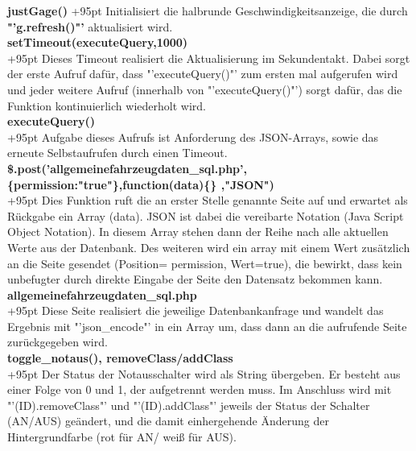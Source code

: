 \documentclass[fontsize = 12pt, paper = a4]{scrreprt}
\begin{document}
\textbf{justGage()}
\hspace{9mm}
\hangindent+95pt  
Initialisiert die halbrunde Geschwindigkeitsanzeige, die durch \textbf{"'g.refresh()"'} aktualisiert wird. \\


\textbf{setTimeout(executeQuery,1000)}\\
\hangindent+95pt  
Dieses Timeout realisiert die Aktualisierung im Sekundentakt. Dabei sorgt der erste Aufruf dafür, dass "'executeQuery()"' zum ersten mal aufgerufen wird und jeder weitere Aufruf (innerhalb von "'executeQuery()"') sorgt dafür, das die Funktion kontinuierlich wiederholt wird.\\ 


\textbf{executeQuery()}\\
\hangindent+95pt  
Aufgabe dieses Aufrufs ist Anforderung des JSON-Arrays, sowie das erneute Selbstaufrufen durch einen Timeout.\\


\textbf{\$.post('allgemeinefahrzeugdaten\_sql.php',\{permission:"true"\},function(data)\{\} ,"JSON")}\\
\hangindent+95pt  
Dies Funktion ruft die an erster Stelle genannte Seite auf und erwartet als Rückgabe ein Array (data). JSON ist dabei die vereibarte Notation (Java Script Object Notation). In diesem Array stehen dann der Reihe nach alle aktuellen Werte aus der Datenbank. Des weiteren wird ein array mit einem Wert zusätzlich an die Seite gesendet (Position= permission, Wert=true), die bewirkt, dass kein unbefugter durch direkte Eingabe der Seite den Datensatz bekommen kann. \\


\textbf{allgemeinefahrzeugdaten\_sql.php}\\
\hangindent+95pt  
Diese Seite realisiert die jeweilige Datenbankanfrage und wandelt das Ergebnis mit "'json\_encode"' in ein Array um, dass dann an die aufrufende Seite zurückgegeben wird.\\


\textbf{toggle\_notaus(), removeClass/addClass}\\
\hangindent+95pt  
Der Status der Notausschalter wird als String übergeben. Er besteht aus einer Folge von 0 und 1, der aufgetrennt werden muss. Im Anschluss wird mit "'(ID).removeClass"' und "'(ID).addClass"' jeweils der Status der Schalter (AN/AUS) geändert, und die damit einhergehende Änderung der Hintergrundfarbe (rot für AN/ weiß für AUS). \\
\end{document}
